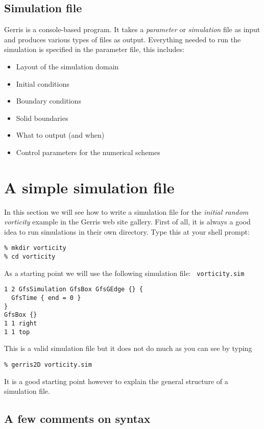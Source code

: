 \documentclass[a4paper]{article}
\begin{document}
\subsection{Simulation file}

Gerris is a console-based program. It takes a {\em parameter} or {\em
simulation} file as input and produces various types of files as output.
Everything needed to run the simulation is specified in the parameter
file, this includes:
\begin{itemize}
\item Layout of the simulation domain
\item Initial conditions
\item Boundary conditions
\item Solid boundaries
\item What to output (and when)
\item Control parameters for the numerical schemes
\end{itemize}

\section{A simple simulation file}

In this section we will see how to write a simulation file for the
{\em initial random vorticity} example in the Gerris web site
gallery. First of all, it is always a good idea to run simulations in
their own directory. Type this at your shell prompt:
\begin{verbatim}
% mkdir vorticity
% cd vorticity
\end{verbatim}
As a starting point we will use the following simulation file: {\tt
vorticity.sim}
\begin{verbatim}
1 2 GfsSimulation GfsBox GfsGEdge {} {
  GfsTime { end = 0 }
}
GfsBox {}
1 1 right
1 1 top
\end{verbatim}
This is a valid simulation file but it does not do much as you can see 
by typing
\begin{verbatim}
% gerris2D vorticity.sim
\end{verbatim}
It is a good starting point however to explain the general structure
of a simulation file.

\subsection{A few comments on syntax}
\end{document}
